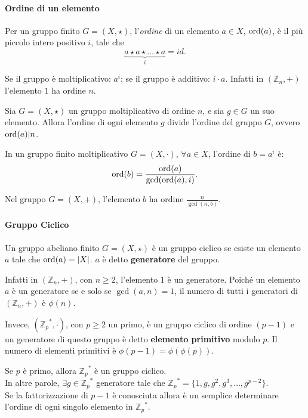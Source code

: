 \paragraph{Ordine di un elemento}
    Per un gruppo finito $G=(X, \star)$, l'\textit{ordine} di un elemento $a \in X$, $\operatorname{ord}(a)$, è il più piccolo intero positivo $i$, tale che 
   \[
   \underbrace{a \star a \star \dots \star a}_{i} = id.
   \]

\noindent Se il gruppo è moltiplicativo: $a^i$; se il gruppo è additivo: $i \cdot a$. Infatti in $(\mathbb{Z}_n, +)$ l'elemento $1$ ha ordine $n$. 

\begin{theorem}
    \label{TeoLagrangeGruppi} Sia $G=(X, \star)$ un gruppo moltiplicativo di ordine $n$, e sia $g \in G$ un suo elemento. Allora l'ordine di ogni elemento $g$ divide l'ordine del gruppo $G$, ovvero $\operatorname{ord}(a) |n$.
\end{theorem}

\begin{theorem}
    In un gruppo finito moltiplicativo $G=(X, \cdot)$, $\forall a \in X$, l'ordine di $b=a^i$ è:
    \[
        \operatorname{ord}(b)=\frac{\operatorname{ord}(a)}{\gcd(\operatorname{ord}(a), i)}.
    \]
\end{theorem} 

\begin{corollary}
     Nel gruppo $G=(X, +)$, l'elemento $b$ ha ordine $\frac{n}{\gcd(n,b)}$.
\end{corollary}

\paragraph{Gruppo Ciclico}
    Un gruppo abeliano finito $G=(X,\star)$ è un gruppo ciclico se esiste un elemento $a$ tale che $\operatorname{ord}(a)=|X|$. $a$ è detto \textbf{generatore} del gruppo. 
 

\vspace{0.2cm}
Infatti in $(\mathbb{Z}_n, +)$, con $n \geq 2$, l'elemento $1$ è un generatore. Poiché un elemento $a$ è un generatore se e solo se $\gcd(a,n)=1$, il numero di tutti i generatori di $(\mathbb{Z}_n, +)$ è $\phi(n)$.

Invece, $({\mathbb{Z}_p}^*, \cdot)$, con $p \geq 2$ un primo, è un gruppo ciclico di ordine $(p-1)$ e un generatore di questo gruppo è detto \textbf{elemento primitivo} modulo $p$. Il numero di elementi primitivi è $\phi(p-1)=\phi(\phi(p))$. 

\begin{theorem}
    Se $p$ è primo, allora ${\mathbb{Z}_p}^*$ è un gruppo ciclico. \\ In altre parole, $\exists g\in {\mathbb{Z}_p}^*$ generatore tale che ${\mathbb{Z}_p}^*=\{1,g,g^2,g^3,\dots,g^{p-2}\}$. \\ Se la fattorizzazione di $p-1$ è conosciuta allora è un semplice determinare l'ordine di ogni singolo elemento in ${\mathbb{Z}_p}^*$.
\end{theorem}

